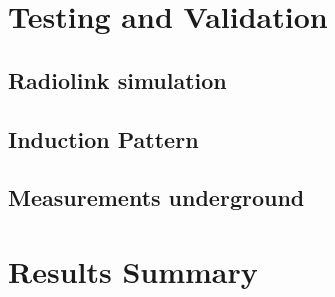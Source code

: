 \section{Testing and Validation}
\subsection{Radiolink simulation}
\subsection{Induction Pattern}
\subsection{Measurements underground}

\section{Results Summary}
